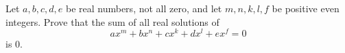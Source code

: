 Let $a,b,c,d,e$ be real numbers, not all zero, and let $m,n,k,l,f$ be positive even integers. Prove that the sum of all real solutions of
\[
ax^m+bx^n+cx^k+dx^l+ex^f=0
\]
is $0$.
